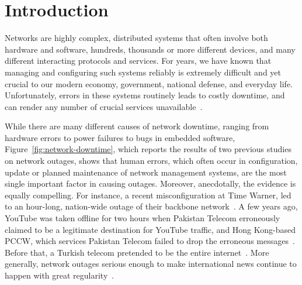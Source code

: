 \section{Introduction}

Networks are highly complex, distributed systems that often involve both 
hardware and software, hundreds, thousands or more different devices, and
many different interacting protocols and services.
For years, we have known that managing and configuring
such systems reliably is extremely difficult and yet crucial to our modern
economy, government, national defense, and everyday life.  Unfortunately,
errors in these systems routinely leads to costly downtime, and
can render any number of crucial services unavailable~\cite{mahajan+:bgp-misconfiguration,feamster+:rcc,batfish,dc-failure-study}.

While there are many different causes of network downtime, ranging
from hardware errors to power failures to bugs in embedded software,
Figure~\ref{fig:network-downtime}, which reports the results of two
previous studies on network outages, shows that human errors, which
often occur in configuration, update or planned maintenance of network
management systems, are the most single important factor in causing
outages.  Moreover, anecdotally, the evidence
is equally compelling.  For instance, a recent misconfiguration at
Time Warner, led to an hour-long, nation-wide outage of their backbone
network~\cite{time-warner}.  A few years ago, YouTube was taken
offline for two hours when Pakistan Telecom erroneously claimed to be
a legitimate destination for YouTube traffic, and Hong Kong-based
PCCW, which services Pakistan Telecom failed to drop the erroneous
messages~\cite{pakistan-youtube}.  Before that, a Turkish telecom
pretended to be the entire internet~\cite{pakistan-youtube}.  More generally,
network outages serious enough to make international news continue to
happen with great regularity~\cite{bgpmon}.



